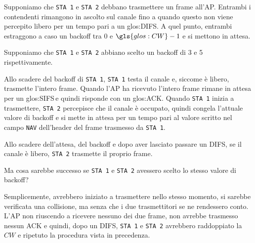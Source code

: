 \begin{eg}
    Supponiamo che \texttt{STA 1} e \texttt{STA 2} debbano trasmettere un frame
    all'AP. Entrambi i contendenti rimangono in ascolto sul canale fino a
    quando questo non viene percepito libero per un tempo pari a un
    \gls{glos:DIFS}. A quel punto, entrambi estraggono a caso un backoff
    tra 0 e $\gls{glos:CW}-1$ e si mettono in attesa.

    Supponiamo che \texttt{STA 1} e \texttt{STA 2} abbiano scelto un backoff di
    3 e 5 rispettivamente.

    \begin{figure}[h!]
        \centering
        \hfill
    \end{figure}\noindent
    Allo scadere del backoff di \texttt{STA 1}, \texttt{STA 1} testa il canale
    e, siccome è libero, trasmette l'intero frame. Quando l'AP ha ricevuto
    l'intero frame rimane in attesa per un \gls{glos:SIFS}\,\footnotemark e
    quindi risponde con un \gls{glos:ACK}. Quando \texttt{STA 1} inizia a
    trasmettere, \texttt{STA 2} percepisce che il canale è occupato, quindi
    congela l'attuale valore di backoff e si mette in attesa per un tempo pari
    al valore scritto nel campo \texttt{NAV} dell'header del frame trasmesso da
    \texttt{STA 1}.
    \begin{figure}[h!]
        \ContinuedFloat
        \centering
        \hfill
    \end{figure}

    \newpage\noindent
    Allo scadere dell'attesa, del backoff e dopo aver lasciato passare un DIFS,
    se il canale è libero, \texttt{STA 2} trasmette il proprio frame.
    \begin{figure}[h!]
        \ContinuedFloat
        \centering
    \end{figure}

    \bigskip\noindent
    Ma cosa sarebbe successo se \texttt{STA 1} e \texttt{STA 2} avessero scelto
    lo stesso valore di backoff?

    Semplicemente, avrebbero iniziato a trasmettere nello stesso momento, si
    sarebbe verificata una collisione, ma senza che i due trasmettitori se ne
    rendessero conto. L'AP non riuscendo a ricevere nessuno dei due frame, non
    avrebbe trasmesso nessun ACK e quindi, dopo un DIFS, \texttt{STA 1} e
    \texttt{STA 2} avrebbero raddoppiato la $CW$ e ripetuto la procedura vista
    in precedenza.
\end{eg}

